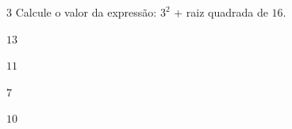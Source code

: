 


\num{3} Calcule o valor da expressão: $3^2$ + raiz quadrada de $16$.

\begin{escolha}
\item $13$
\item $11$
\item $7$
\item $10$
\end{escolha}




